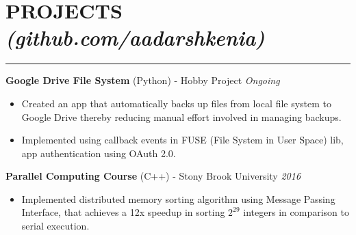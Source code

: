 \documentclass[12pt]{article}
\newcommand{\sectionHeadingWithLink}[2]{
\vspace{-15pt}
\section*{\small{#1 \textit{#2}}}
\vspace{-10pt}
\hrule
\vspace{6pt}
}
\newcommand {\projectSectionSubheadingAlternate}[4]{
    \noindent \small{\textbf{#1} (#3) - #2 \hfill \textit{#4}} \\
    \vspace{-22pt}
}
\newcommand{\sectionListStart}{
    \begin{itemize}[label={\small{\textbullet}}, leftmargin=20pt] %
}
\newcommand{\sectionListStartWiderSpacing}{
    \begin{itemize}[label={\small{\textbullet}}, leftmargin=20pt, itemsep=-2pt] %
}
\newcommand{\sectionListEnd}{\end{itemize} \vspace{-5pt}}
\newcommand{\sectionListItem}[1]{\item \small{#1}}
\newcommand{\projectNameListItem}[4]{
\item \small{\textbf{#1} \textit{(#2)} : #3  \hfill \textit{#4}}
}
\begin{document}






\sectionHeadingWithLink{PROJECTS}{(github.com/aadarshkenia)}
\projectSectionSubheadingAlternate{Google Drive File System}{Hobby Project}{Python}{Ongoing}
\sectionListStart
    \sectionListItem
        Created an app that automatically backs up files from local file system to Google Drive thereby reducing manual effort involved in managing backups.
    \sectionListItem
        Implemented using callback events in FUSE (File System in User Space) lib, app authentication using OAuth 2.0.
        
\sectionListEnd

\projectSectionSubheadingAlternate{Parallel Computing Course}{Stony Brook University}{C++}{2016}
\sectionListStart
    \sectionListItem
        Implemented distributed memory sorting algorithm using Message Passing Interface, that achieves a 12x speedup in sorting $2^{29}$ integers in comparison to serial execution.
\sectionListEnd
\end{document}
